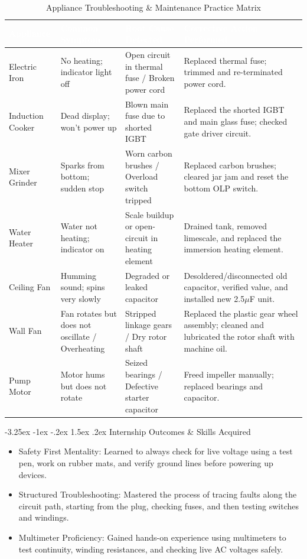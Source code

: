 \documentclass[11pt,a4paper]{report}
\makeatletter
\renewcommand{\section}{\@startsection{section}{1}{\z@}%
  {-3.25ex \@plus -1ex \@minus -.2ex}%
  {1.5ex \@plus.2ex}%
  {\normalfont\Large\bfseries\color{primaryColor}}}
\makeatother
\begin{document}
\begin{table}[H]
\centering
\begin{tabularx}{\textwidth}{l X X X}
\rowcolor{primaryColor}
\textcolor{white}{\textbf{Appliance}} & \textcolor{white}{\textbf{Common Symptom}} & \textcolor{white}{\textbf{Root Cause Detected}} & \textcolor{white}{\textbf{Corrective Action Performed}} \\
\midrule
Electric Iron & No heating; indicator light off & Open circuit in thermal fuse / Broken power cord & Replaced thermal fuse; trimmed and re-terminated power cord. \\
Induction Cooker & Dead display; won't power up & Blown main fuse due to shorted IGBT & Replaced the shorted IGBT and main glass fuse; checked gate driver circuit. \\
Mixer Grinder & Sparks from bottom; sudden stop & Worn carbon brushes / Overload switch tripped & Replaced carbon brushes; cleared jar jam and reset the bottom OLP switch. \\
Water Heater & Water not heating; indicator on & Scale buildup or open-circuit in heating element & Drained tank, removed limescale, and replaced the immersion heating element. \\
Ceiling Fan & Humming sound; spins very slowly & Degraded or leaked capacitor & Desoldered/disconnected old capacitor, verified value, and installed new 2.5$\mu$F unit. \\
Wall Fan & Fan rotates but does not oscillate / Overheating & Stripped linkage gears / Dry rotor shaft & Replaced the plastic gear wheel assembly; cleaned and lubricated the rotor shaft with machine oil. \\
Pump Motor & Motor hums but does not rotate & Seized bearings / Defective starter capacitor & Freed impeller manually; replaced bearings and capacitor. \\
\bottomrule
\end{tabularx}
\caption{Appliance Troubleshooting \& Maintenance Practice Matrix}
\end{table}
\section{Internship Outcomes \& Skills Acquired}
\begin{itemize}
  \item Safety First Mentality: Learned to always check for live voltage using a test pen, work on rubber mats, and verify ground lines before powering up devices.
  \item Structured Troubleshooting: Mastered the process of tracing faults along the circuit path, starting from the plug, checking fuses, and then testing switches and windings.
  \item Multimeter Proficiency: Gained hands-on experience using multimeters to test continuity, winding resistances, and checking live AC voltages safely.
\end{itemize}
\end{document}
